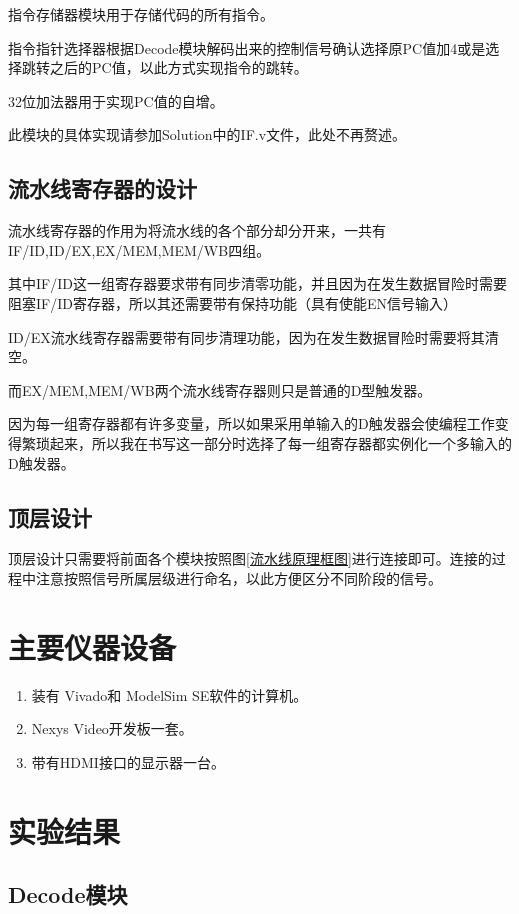 \documentclass{../source/zjureport}
\begin{document}
        指令存储器模块用于存储代码的所有指令。

        指令指针选择器根据Decode模块解码出来的控制信号确认选择原PC值加4或是选择跳转之后的PC值，以此方式实现指令的跳转。

        32位加法器用于实现PC值的自增。

        此模块的具体实现请参加Solution中的IF.v文件，此处不再赘述。

        \subsection{流水线寄存器的设计}
        流水线寄存器的作用为将流水线的各个部分却分开来，一共有IF/ID,ID/EX,EX/MEM,MEM/WB四组。
        
        其中IF/ID这一组寄存器要求带有同步清零功能，并且因为在发生数据冒险时需要阻塞IF/ID寄存器，所以其还需要带有保持功能（具有使能EN信号输入）

        ID/EX流水线寄存器需要带有同步清理功能，因为在发生数据冒险时需要将其清空。

        而EX/MEM,MEM/WB两个流水线寄存器则只是普通的D型触发器。

        因为每一组寄存器都有许多变量，所以如果采用单输入的D触发器会使编程工作变得繁琐起来，所以我在书写这一部分时选择了每一组寄存器都实例化一个多输入的D触发器。

        \subsection{顶层设计}
        顶层设计只需要将前面各个模块按照图\ref{流水线原理框图}进行连接即可。连接的过程中注意按照信号所属层级进行命名，以此方便区分不同阶段的信号。

    \section{主要仪器设备}
    \begin{enumerate}
        \item 装有 Vivado和 ModelSim SE软件的计算机。
        \item Nexys Video开发板一套。
        \item 带有HDMI接口的显示器一台。
    \end{enumerate}

    \section{实验结果}
        \subsection{Decode模块}
\end{document}
